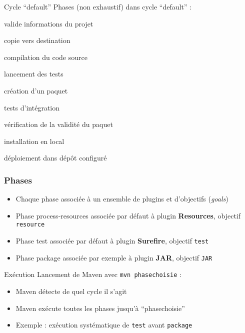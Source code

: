 \documentclass[english, french]{beamer}
\begin{document}
\begin{frame}{Cycle “default”}
	Phases {\tiny (non exhaustif)} dans cycle “default” :
	\begin{description}
		\item[validate] valide informations du projet
		\item[process-resources] copie vers destination
		\item[compile] compilation du code source
		\item[test] lancement des tests
		\item[package] création d’un paquet
		\item[integration-test] tests d’intégration
		\item[verify] vérification de la validité du paquet
		\item[install] installation en local
		\item[deploy] déploiement dans dépôt configuré
	\end{description}
\end{frame}

\begin{frame}
	\frametitle{Phases}
	\begin{itemize}
		\item Chaque phase associée à un ensemble de plugins et d’objectifs (\emph{goals})
		\item Phase process-resources associée {\tiny par défaut} à plugin \textbf{Resources}, objectif \texttt{resource}
		\item Phase test associée {\tiny par défaut} à plugin \textbf{Surefire}, objectif \texttt{test}
		\item Phase package associée {\tiny par exemple} à plugin \textbf{JAR}, objectif \texttt{JAR}
	\end{itemize}
	\begin{block}{Exécution}
		Lancement de Maven avec \texttt{mvn phasechoisie} :
		\begin{itemize}
			\item Maven détecte de quel cycle il s’agit
			\item Maven exécute toutes les phases jusqu’à “phasechoisie”
			\item Exemple : exécution systématique de \texttt{test} avant \texttt{package}
		\end{itemize}
	\end{block}
\end{frame}
\end{document}
